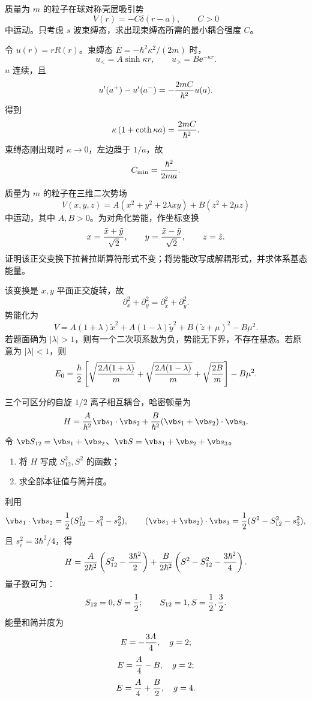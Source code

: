 \begin{question}
质量为 $m$ 的粒子在球对称壳层吸引势
\[
  V(r)=-C\delta(r-a),\qquad C>0
\]
中运动。只考虑 $s$ 波束缚态，求出现束缚态所需的最小耦合强度 $C$。
\begin{solution}
令 $u(r)=rR(r)$。束缚态 $E=-\hbar^2\kappa^2/(2m)$ 时，
\[
  u_< =A\sinh\kappa r,
  \qquad u_>=B\ee^{-\kappa r}.
\]
$u$ 连续，且
\[
  u'(a^+)-u'(a^-)=-{2mC\over\hbar^2}u(a).
\]
得到
\[
  \kappa\left(1+\coth\kappa a\right)={2mC\over\hbar^2}.
\]
束缚态刚出现时 $\kappa\to0$，左边趋于 $1/a$，故
\[
  C_{\min}={\hbar^2\over2ma}.
\]
\end{solution}
\end{question}

\begin{question}
质量为 $m$ 的粒子在三维二次势场
\[
  V(x,y,z)=A(x^2+y^2+2\lambda xy)+B(z^2+2\mu z)
\]
中运动，其中 $A,B>0$。为对角化势能，作坐标变换
\[
  x={\tilde x+\tilde y\over\sqrt2},\qquad y={\tilde x-\tilde y\over\sqrt2},\qquad z=\tilde z.
\]
证明该正交变换下拉普拉斯算符形式不变；将势能改写成解耦形式，并求体系基态能量。
\begin{solution}
该变换是 $x,y$ 平面正交旋转，故
\[
  \partial_x^2+\partial_y^2=\partial_{\tilde x}^2+\partial_{\tilde y}^2.
\]
势能化为
\[
  V=A(1+\lambda)\tilde x^2+A(1-\lambda)\tilde y^2+B(\tilde z+\mu)^2-B\mu^2.
\]
若题面确为 $|\lambda|>1$，则有一个二次项系数为负，势能无下界，不存在基态。若原意为 $|\lambda|<1$，则
\[
  E_0={\hbar\over2}\left[\sqrt{2A(1+\lambda)\over m}+\sqrt{2A(1-\lambda)\over m}+\sqrt{2B\over m}\right]-B\mu^2.
\]
\end{solution}
\end{question}

\begin{question}
三个可区分的自旋 $1/2$ 离子相互耦合，哈密顿量为
\[
  H={A\over\hbar^2}\vb s_1\cdot\vb s_2+{B\over\hbar^2}(\vb s_1+\vb s_2)\cdot\vb s_3.
\]
令 $\vb S_{12}=\vb s_1+\vb s_2$、$\vb S=\vb s_1+\vb s_2+\vb s_3$。
\begin{enumerate}
  \item 将 $H$ 写成 $S_{12}^2,S^2$ 的函数；
  \item 求全部本征值与简并度。
\end{enumerate}
\begin{solution}
利用
\[
  \vb s_1\cdot\vb s_2={1\over2}(S_{12}^2-s_1^2-s_2^2),
  \qquad
  (\vb s_1+\vb s_2)\cdot\vb s_3={1\over2}(S^2-S_{12}^2-s_3^2),
\]
且 $s_i^2=3\hbar^2/4$，得
\[
  H={A\over2\hbar^2}\left(S_{12}^2-{3\hbar^2\over2}\right)
  +{B\over2\hbar^2}\left(S^2-S_{12}^2-{3\hbar^2\over4}\right).
\]
量子数可为：
\[
  S_{12}=0, S={1\over2};
  \qquad S_{12}=1, S={1\over2},{3\over2}.
\]
能量和简并度为
\[
  E=-{3A\over4},\quad g=2;
\]
\[
  E={A\over4}-B,\quad g=2;
\]
\[
  E={A\over4}+{B\over2},\quad g=4.
\]
\end{solution}
\end{question}

